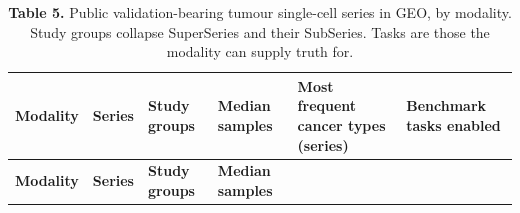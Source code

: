 \documentclass[11pt]{article}
\newenvironment{tablefont}{\par\scriptsize\setlength{\tabcolsep}{3.5pt}}{\par}
\newcommand{\thead}[1]{\textbf{#1}}
\begin{document}
\begin{tablefont}

\begin{longtable}[l]{@{}
  >{\raggedright\arraybackslash}p{}
  >{\raggedright\arraybackslash}p{}
  >{\raggedright\arraybackslash}p{}
  >{\raggedright\arraybackslash}p{}
  >{\raggedright\arraybackslash}p{}
  >{\raggedright\arraybackslash}p{}@{}}
\caption{\textbf{Table 5.} Public validation-bearing tumour single-cell series in
GEO, by modality. Study groups collapse SuperSeries and their SubSeries.
Tasks are those the modality can supply truth for.}\tabularnewline
\toprule
\begin{minipage}[b]{\linewidth}\raggedright
\thead{Modality}
\end{minipage} & \begin{minipage}[b]{\linewidth}\raggedright
\thead{Series}
\end{minipage} & \begin{minipage}[b]{\linewidth}\raggedright
\thead{Study groups}
\end{minipage} & \begin{minipage}[b]{\linewidth}\raggedright
\thead{Median samples}
\end{minipage} & \begin{minipage}[b]{\linewidth}\raggedright
\thead{Most frequent cancer types (series)}
\end{minipage} & \begin{minipage}[b]{\linewidth}\raggedright
\thead{Benchmark tasks enabled}
\end{minipage} \\
\midrule
\endfirsthead
\toprule
\begin{minipage}[b]{\linewidth}\raggedright
\thead{Modality}
\end{minipage} & \begin{minipage}[b]{\linewidth}\raggedright
\thead{Series}
\end{minipage} & \begin{minipage}[b]{\linewidth}\raggedright
\thead{Study groups}
\end{minipage} & \begin{minipage}[b]{\linewidth}\raggedright
\thead{Median samples}
\end{minipage} & \begin{minipage}[b]{\linewidth}\raggedright

\end{minipage}
\end{longtable}
\end{tablefont}
\end{document}
